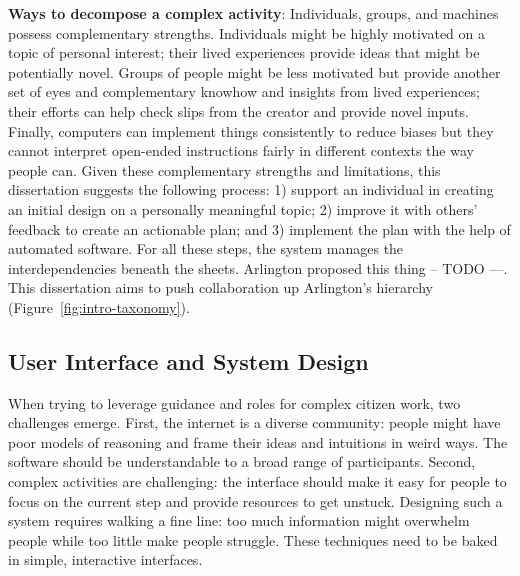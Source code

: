 \textbf{Ways to decompose a complex activity}: 
Individuals, groups, and machines possess complementary strengths. Individuals might be highly motivated on a topic of personal interest; their lived experiences provide ideas that might be potentially novel. Groups of people might be less motivated but provide another set of eyes and complementary knowhow and insights from lived experiences; their efforts can help check slips from the creator and provide novel inputs. Finally, computers can implement things consistently to reduce biases but they cannot interpret open-ended instructions fairly in different contexts the way people can. Given these complementary strengths and limitations, this dissertation suggests the following process: 1) support an individual in creating an initial design on a personally meaningful topic; 2) improve it with others' feedback to create an actionable plan; and 3) implement the plan with the help of automated software. For all these steps, the system manages the interdependencies beneath the sheets. Arlington proposed this thing -- TODO ---. This dissertation aims to push collaboration up Arlington's hierarchy (Figure~\ref{fig:intro-taxonomy}). 




\subsection{User Interface and System Design}

When trying to leverage guidance and roles for complex citizen work, two challenges emerge. First, the internet is a diverse community: people might have poor models of reasoning and frame their ideas and intuitions in weird ways. The software should be understandable to a broad range of participants. Second, complex activities are challenging: the interface should make it easy for people to focus on the current step and provide resources to get unstuck. Designing such a system requires walking a fine line: too much information might overwhelm people while too little make people struggle. These techniques need to be baked in simple, interactive interfaces.

